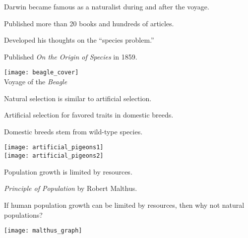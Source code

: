 \documentclass[t,handout]{beamer}  %
\begin{document}
{
	\begin{frame}[t]
\end{frame}
}

{
\begin{frame}[t]{}
\end{frame}
}

{
\begin{frame}[t]{Darwin became famous as a naturalist during and after the voyage.}

\begin{multicols}{2}

\hangpara Published more than 20 books and hundreds of articles.

\hangpara Developed his thoughts on the “species problem.”

\hangpara Published \textit{On the Origin of Species} in 1859.

\columnbreak

\centering
\texttt{[image: beagle\_cover]}\\
Voyage of the \textit{Beagle}

\end{multicols}

\end{frame}
}

{
\begin{frame}[t]{Natural selection is similar to artificial selection.}
	
	\begin{multicols}{2}
		
		\hangpara Artificial selection for favored traits in domestic breeds.
		
		\hangpara Domestic breeds stem from wild-type species.
				
		\columnbreak
		
		\centering
		\texttt{[image: artificial\_pigeons1]}\\
		\texttt{[image: artificial\_pigeons2]}
		
	\end{multicols}
	
\end{frame}
}

{
\begin{frame}[t]{Population growth is limited by resources.}
	
	\begin{multicols}{2}
		
		\hangpara \textit{Principle of Population} by Robert Malthus.
		
		\hangpara If human population growth can be limited by resources, then why not natural populations?
		
		\columnbreak
		
		\centering
		\texttt{[image: malthus\_graph]}
		
	\end{multicols}
	
\end{frame}
}
\end{document}
